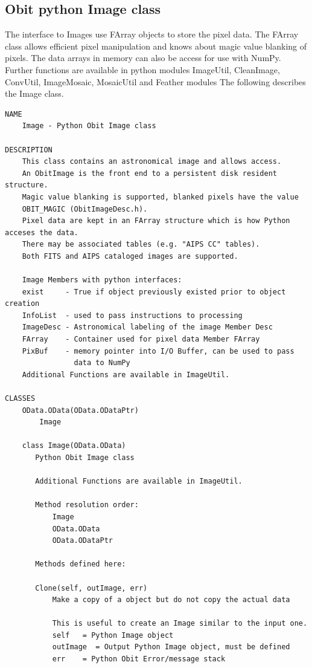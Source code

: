 \documentclass[11pt]{report}
\begin{document}
\subsection{Obit python Image class}
The interface to Images use FArray objects to store the pixel data.
The FArray class allows efficient pixel manipulation and knows about
magic value blanking of pixels.
The data arrays in memory can also be access for use with NumPy.
Further functions are available in python modules ImageUtil,
CleanImage, ConvUtil, ImageMosaic, MosaicUtil and Feather modules
The following describes the Image class.
\begin{verbatim}
NAME
    Image - Python Obit Image class

DESCRIPTION
    This class contains an astronomical image and allows access.
    An ObitImage is the front end to a persistent disk resident structure.
    Magic value blanking is supported, blanked pixels have the value
    OBIT_MAGIC (ObitImageDesc.h).
    Pixel data are kept in an FArray structure which is how Python acceses the data.
    There may be associated tables (e.g. "AIPS CC" tables).
    Both FITS and AIPS cataloged images are supported.
    
    Image Members with python interfaces:
    exist     - True if object previously existed prior to object creation
    InfoList  - used to pass instructions to processing
    ImageDesc - Astronomical labeling of the image Member Desc 
    FArray    - Container used for pixel data Member FArray
    PixBuf    - memory pointer into I/O Buffer, can be used to pass
                data to NumPy
    Additional Functions are available in ImageUtil.

CLASSES
    OData.OData(OData.ODataPtr)
        Image
    
    class Image(OData.OData)
       Python Obit Image class
       
       Additional Functions are available in ImageUtil.
       
       Method resolution order:
           Image
           OData.OData
           OData.ODataPtr
       
       Methods defined here:
       
       Clone(self, outImage, err)
           Make a copy of a object but do not copy the actual data
           
           This is useful to create an Image similar to the input one.
           self   = Python Image object
           outImage  = Output Python Image object, must be defined
           err    = Python Obit Error/message stack
       

\end{verbatim}
\end{document}
